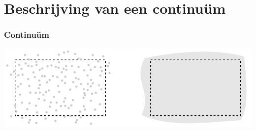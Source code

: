 \documentclass[t]{beamer}
\subtitle{Basisbegrippen}
\begin{document}
	\frame{\titlepage}
	\section{Beschrijving van een continuüm}
		\begin{frame}
			\frametitle{Continuüm}
			\vspace{1cm}
			\center
			\includegraphics{fig/basisbegrippen/Continuum}
  		\end{frame}
\end{document}
